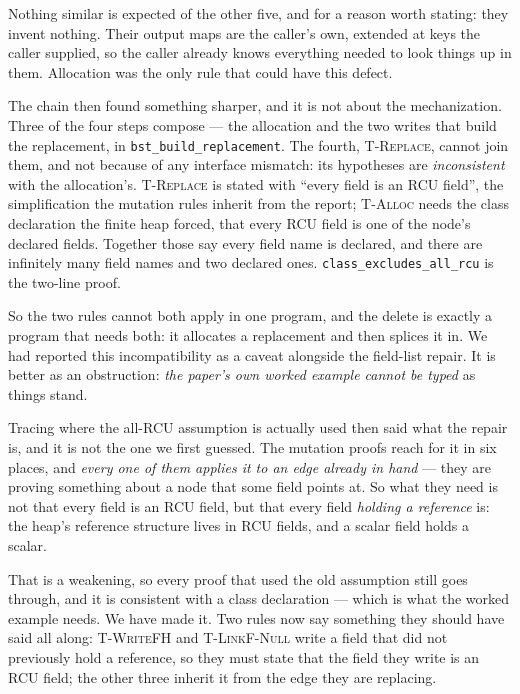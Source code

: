 Nothing similar is expected of the other five, and for a reason worth stating:
they invent nothing.  Their output maps are the caller's own, extended at keys
the caller supplied, so the caller already knows everything needed to look
things up in them.  Allocation was the only rule that could have this defect.

The chain then found something sharper, and it is not about the mechanization.
Three of the four steps compose --- the allocation and the two writes that build
the replacement, in \texttt{bst\_build\_replacement}.  The fourth,
\textsc{T-Replace}, cannot join them, and not because of any interface
mismatch: its hypotheses are \emph{inconsistent} with the allocation's.
\textsc{T-Replace} is stated with ``every field is an RCU field'', the
simplification the mutation rules inherit from the report;
\textsc{T-Alloc} needs the class declaration the finite heap forced, that every
RCU field is one of the node's declared fields.  Together those say every field
name is declared, and there are infinitely many field names and two declared
ones.  \texttt{class\_excludes\_all\_rcu} is the two-line proof.

So the two rules cannot both apply in one program, and the delete is exactly a
program that needs both: it allocates a replacement and then splices it in.  We
had reported this incompatibility as a caveat alongside the field-list repair.
It is better as an obstruction: \emph{the paper's own worked example cannot be
typed} as things stand.

Tracing where the all-RCU assumption is actually used then said what the repair
is, and it is not the one we first guessed.  The mutation proofs reach for it in
six places, and \emph{every one of them applies it to an edge already in hand}
--- they are proving something about a node that some field points at.  So what
they need is not that every field is an RCU field, but that every field
\emph{holding a reference} is: the heap's reference structure lives in RCU
fields, and a scalar field holds a scalar.

That is a weakening, so every proof that used the old assumption still goes
through, and it is consistent with a class declaration --- which is what the
worked example needs.  We have made it.  Two rules now say something they should
have said all along: \textsc{T-WriteFH} and \textsc{T-LinkF-Null} write a field
that did not previously hold a reference, so they must state that the field they
write is an RCU field; the other three inherit it from the edge they are
replacing.

